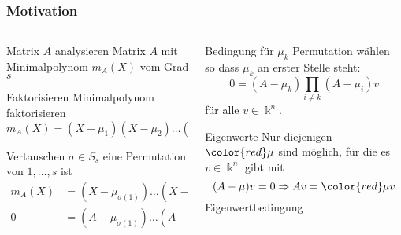 %
%
%
\begin{frame}[t]
\setlength{\abovedisplayskip}{5pt}
\setlength{\belowdisplayskip}{5pt}
\frametitle{Motivation}
\begin{columns}[t,onlytextwidth]
\begin{column}{0.48\textwidth}
\begin{block}{Matrix $A$ analysieren}
Matrix $A$ mit Minimalpolynom $m_A(X)$ vom
Grad $s$
\end{block}
\begin{block}{Faktorisieren}
Minimalpolynom faktorisieren
\[
m_A(X)
=
(X-\mu_1)(X-\mu_2)\dots(X-\mu_s)
\]
\end{block}
\begin{block}{Vertauschen}
$\sigma\in S_s$ eine Permutation von $1,\dots,s$
ist
\begin{align*}
m_A(X)
&=
(X-\mu_{\sigma(1)})
\dots
(X-\mu_{\sigma(s)})
\\
0
&=
(A-\mu_{\sigma(1)})
\dots
(A-\mu_{\sigma(s)})
\end{align*}
\end{block}
\end{column}
\begin{column}{0.48\textwidth}
\begin{block}{Bedingung für $\mu_k$}
Permutation wählen so dass $\mu_k$ an erster Stelle steht:
\[
0=(A-\mu_k) \prod_{i\ne k}(A-\mu_i) v
\]
für alle $v\in\Bbbk^n$.
\end{block}
\begin{block}{Eigenwerte}
Nur diejenigen ${\color{red}\mu}$ sind möglich, für die es $v\in\Bbbk^n$
gibt mit
\[
(A-\mu)v = 0
\Rightarrow Av = {\color{red}\mu} v
\]
Eigenwertbedingung
\end{block}
\end{column}
\end{columns}
\end{frame}
